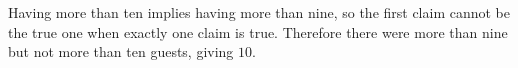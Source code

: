 Having more than ten implies having more than nine, so the first claim cannot be the true one when exactly one claim is true. Therefore there were more than nine but not more than ten guests, giving $\boxed{10}$.
